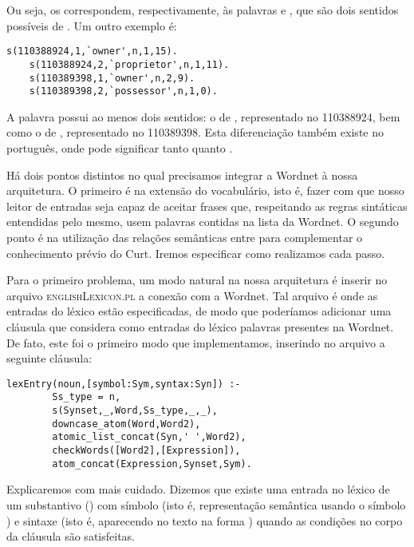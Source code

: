 	Ou seja, os  correspondem, respectivamente, às palavras  e , que são dois sentidos possíveis de . Um outro exemplo é:
	
	\begin{Verbatim}[fontseries=b,gobble=1]
	s(110388924,1,`owner',n,1,15).
	s(110388924,2,`proprietor',n,1,11).
	s(110389398,1,`owner',n,2,9).
	s(110389398,2,`possessor',n,1,0).
	\end{Verbatim}
	
	A palavra  possui ao menos dois sentidos: o de , representado no  110388924, bem como o de , representado no  110389398. Esta diferenciação também existe no português, onde  pode significar tanto  quanto .
	

	Há dois pontos distintos no qual precisamos integrar a Wordnet à nossa arquitetura. O primeiro é na extensão do vocabulário, isto é, fazer com que nosso leitor de entradas seja capaz de aceitar frases que, respeitando as regras sintáticas entendidas pelo mesmo, usem palavras contidas na lista da Wordnet. O segundo ponto é na utilização das relações semânticas entre  para complementar o conhecimento prévio do Curt. Iremos especificar como realizamos cada passo.
	
	
	Para o primeiro problema, um modo natural na nossa arquitetura é inserir no arquivo \textsc{englishLexicon.pl} a conexão com a Wordnet. Tal arquivo é onde as entradas do léxico estão especificadas, de modo que poderíamos adicionar uma cláusula que considera como entradas do léxico palavras presentes na Wordnet. De fato, este foi o primeiro modo que implementamos, inserindo no arquivo a seguinte cláusula:
	
	\begin{Verbatim}[fontseries=b,gobble=1]
	lexEntry(noun,[symbol:Sym,syntax:Syn]) :-
	    Ss_type = n,
	    s(Synset,_,Word,Ss_type,_,_),
	    downcase_atom(Word,Word2),
	    atomic_list_concat(Syn,' ',Word2),
	    checkWords([Word2],[Expression]),
	    atom_concat(Expression,Synset,Sym).
	\end{Verbatim}	
	
	Explicaremos com mais cuidado. Dizemos que existe uma entrada no léxico de um substantivo () com símbolo  (isto é, representação semântica usando o símbolo ) e sintaxe  (isto é, aparecendo no texto na forma ) quando as condições no corpo da cláusula são satisfeitas.
	
